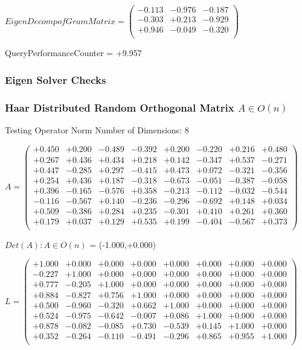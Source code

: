 \documentclass[9pt]{article}
\theoremstyle{plain}
\theoremstyle{definition}
\theoremstyle{remark}
\numberwithin{equation}{section}
\begin{document}
$EigenDecomp of Gram Matrix = \left(
\begin{array}{
ccc}
-0.113 & -0.976 & -0.187 \\
-0.303 & +0.213 & -0.929 \\
+0.946 & -0.049 & -0.320 \\
\end{array}
\right)$ \newline 

QueryPerformanceCounter  =  +9.957
\subsubsection{Eigen Solver Checks}
\subsubsection{Haar Distributed Random Orthogonal Matrix $A \in O(n)$}
 Testing Operator Norm
Number of Dimensions: 8

$A = \left(
\begin{array}{
cccccccc}
+0.450 & +0.200 & -0.489 & -0.392 & +0.200 & -0.220 & +0.216 & +0.480 \\
+0.267 & +0.436 & +0.434 & +0.218 & +0.142 & -0.347 & +0.537 & -0.271 \\
+0.447 & -0.285 & +0.297 & -0.415 & +0.473 & +0.072 & -0.321 & -0.356 \\
+0.254 & +0.436 & +0.187 & -0.318 & -0.673 & -0.051 & -0.387 & -0.058 \\
+0.396 & -0.165 & -0.576 & +0.358 & -0.213 & -0.112 & -0.032 & -0.544 \\
-0.116 & -0.567 & +0.140 & -0.236 & -0.296 & -0.692 & +0.148 & +0.034 \\
+0.509 & -0.386 & +0.284 & +0.235 & -0.301 & +0.410 & +0.261 & +0.360 \\
+0.179 & +0.037 & +0.129 & +0.535 & +0.199 & -0.404 & -0.567 & +0.373 \\
\end{array}
\right)$ \newline 

$Det(A) :   A \in O(n)$ = (-1.000,+0.000)

$L = \left(
\begin{array}{
cccccccc}
+1.000 & +0.000 & +0.000 & +0.000 & +0.000 & +0.000 & +0.000 & +0.000 \\
-0.227 & +1.000 & +0.000 & +0.000 & +0.000 & +0.000 & +0.000 & +0.000 \\
+0.777 & -0.205 & +1.000 & +0.000 & +0.000 & +0.000 & +0.000 & +0.000 \\
+0.884 & -0.827 & +0.756 & +1.000 & +0.000 & +0.000 & +0.000 & +0.000 \\
+0.500 & -0.960 & -0.320 & +0.662 & +1.000 & +0.000 & +0.000 & +0.000 \\
+0.524 & -0.975 & -0.642 & -0.007 & +0.086 & +1.000 & +0.000 & +0.000 \\
+0.878 & -0.082 & -0.085 & +0.730 & -0.539 & +0.145 & +1.000 & +0.000 \\
+0.352 & -0.264 & -0.110 & -0.491 & -0.296 & +0.865 & +0.955 & +1.000 \\
\end{array}
\right)$ \newline 
\end{document}
